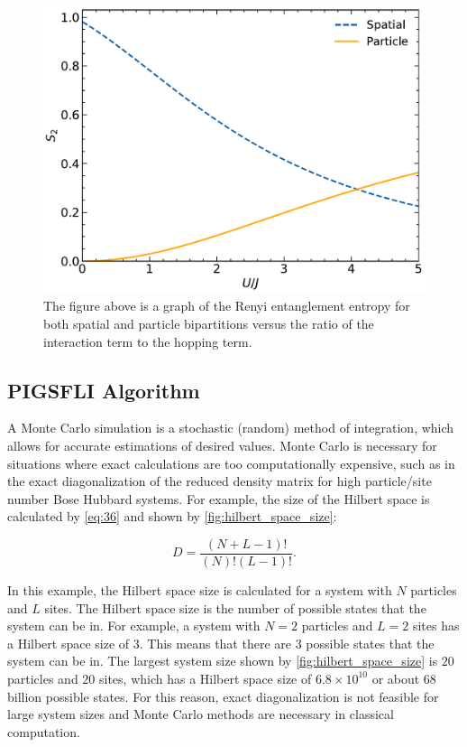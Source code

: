 
\begin{figure}[H]
\centering
\includegraphics[scale=0.5]{../figures/ed_renyi.pdf}
\caption{The figure above is a graph of the Renyi entanglement entropy for both spatial and particle bipartitions versus the ratio of the interaction term to the hopping term.}
\end{figure}

\subsection{PIGSFLI Algorithm} \label{PIGSFLI}

A Monte Carlo simulation is a stochastic (random) method of integration, which allows for accurate estimations of desired values. Monte Carlo is necessary for situations where exact calculations are too computationally expensive, such as in the exact diagonalization of the reduced density matrix for high particle/site number Bose Hubbard systems. For example, the size of the Hilbert space is calculated by \cref{eq:36} and shown by \cref{fig:hilbert_space_size}:

\begin{equation}
D = \frac{\left(N+L-1\right)!}{\left(N\right)!\left(L-1\right)!}.
\label{eq:36}
\end{equation}

In this example, the Hilbert space size is calculated for a system with $N$ particles and $L$ sites. The Hilbert space size is the number of possible states that the system can be in. For example, a system with $N=2$ particles and $L=2$ sites has a Hilbert space size of $3$. This means that there are $3$ possible states that the system can be in. The largest system size shown by \cref{fig:hilbert_space_size} is $20$ particles and $20$ sites, which has a Hilbert space size of $6.8 \times 10^{10}$ or about 68 billion possible states. For this reason, exact diagonalization is not feasible for large system sizes and Monte Carlo methods are necessary in classical computation.

